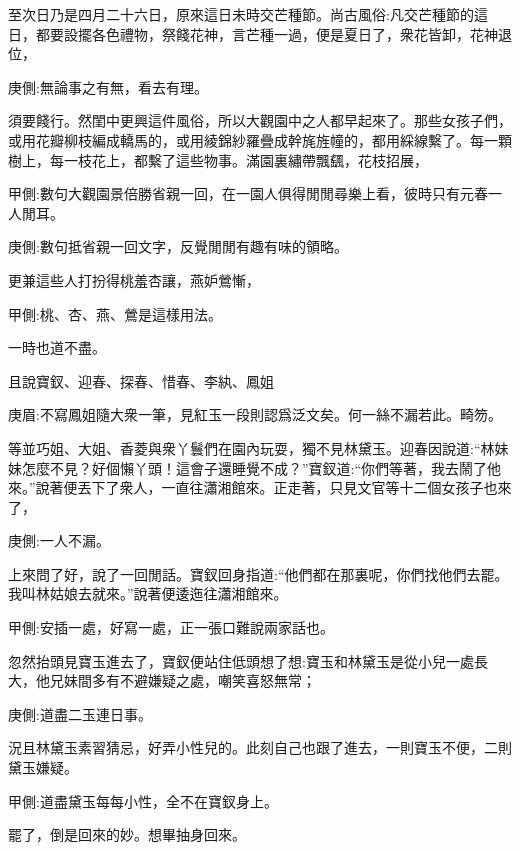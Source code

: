 \begin{parag}
    至次日乃是四月二十六日，原來這日未時交芒種節。尚古風俗:凡交芒種節的這日，都要設擺各色禮物，祭餞花神，言芒種一過，便是夏日了，衆花皆卸，花神退位，\begin{note}庚側:無論事之有無，看去有理。\end{note}須要餞行。然閨中更興這件風俗，所以大觀園中之人都早起來了。那些女孩子們，或用花瓣柳枝編成轎馬的，或用綾錦紗羅疊成幹旄旌幢的，都用綵線繫了。每一顆樹上，每一枝花上，都繫了這些物事。滿園裏繡帶飄颻，花枝招展，\begin{note}甲側:數句大觀園景倍勝省親一回，在一園人俱得閒閒尋樂上看，彼時只有元春一人閒耳。\end{note}\begin{note}庚側:數句抵省親一回文字，反覺閒閒有趣有味的領略。\end{note}更兼這些人打扮得桃羞杏讓，燕妒鶯慚，\begin{note}甲側:桃、杏、燕、鶯是這樣用法。\end{note}一時也道不盡。
\end{parag}


\begin{parag}
    且說寶釵、迎春、探春、惜春、李紈、鳳姐\begin{note}庚眉:不寫鳳姐隨大衆一筆，見紅玉一段則認爲泛文矣。何一絲不漏若此。畸笏。\end{note}等並巧姐、大姐、香菱與衆丫鬟們在園內玩耍，獨不見林黛玉。迎春因說道:“林妹妹怎麼不見？好個懶丫頭！這會子還睡覺不成？”寶釵道:“你們等著，我去鬧了他來。”說著便丟下了衆人，一直往瀟湘館來。正走著，只見文官等十二個女孩子也來了，\begin{note}庚側:一人不漏。\end{note}上來問了好，說了一回閒話。寶釵回身指道:“他們都在那裏呢，你們找他們去罷。我叫林姑娘去就來。”說著便逶迤往瀟湘館來。\begin{note}甲側:安插一處，好寫一處，正一張口難說兩家話也。\end{note}忽然抬頭見寶玉進去了，寶釵便站住低頭想了想:寶玉和林黛玉是從小兒一處長大，他兄妹間多有不避嫌疑之處，嘲笑喜怒無常；\begin{note}庚側:道盡二玉連日事。\end{note}況且林黛玉素習猜忌，好弄小性兒的。此刻自己也跟了進去，一則寶玉不便，二則黛玉嫌疑。\begin{note}甲側:道盡黛玉每每小性，全不在寶釵身上。\end{note}罷了，倒是回來的妙。想畢抽身回來。
\end{parag}


